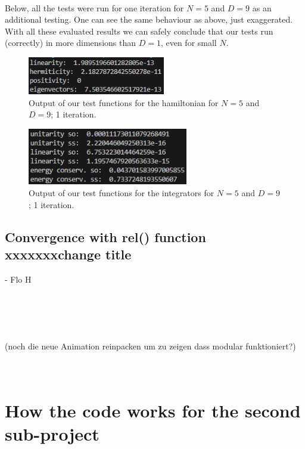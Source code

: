 \documentclass[11pt, letterpaper, onecolumn]{article}
\begin{document}
	\\
	Below, all the tests were run for one iteration for $N=5$ and $D=9$ as an additional testing. One can see the same behaviour as above, just exaggerated. \\
	With all these evaluated results we can safely conclude that our tests run (correctly) in more dimensions than $D=1$, even for small $N$.
	\begin{figure} [h] 
	\begin{center}
	\includegraphics[width=6cm]{"test_hamiltonian-9D2.png"}
	\caption{Output of our test functions for the hamiltonian for $N=5$ and $D=9$; 1 iteration.}
	\end{center}
	\end{figure}
	\begin{figure} [h] 
	\begin{center}
	\includegraphics[width=7cm]{"test_integrators-9D2.png"}
	\caption{Output of our test functions for the integrators for $N=5$ and $D=9$; 1 iteration.}
	\end{center}
	\end{figure}
	
	
	
	
	
	
	
	\subsection{Convergence with rel() function xxxxxxxchange title}
	- Flo H
	
	

	\\
 	\\
  	\\
   	\\
 	(noch die neue Animation reinpacken um zu zeigen dass modular funktioniert?)
  	\\
   	\\
    	\\
	
	\section{How the code works for the second sub-project}	
	
\end{document}
